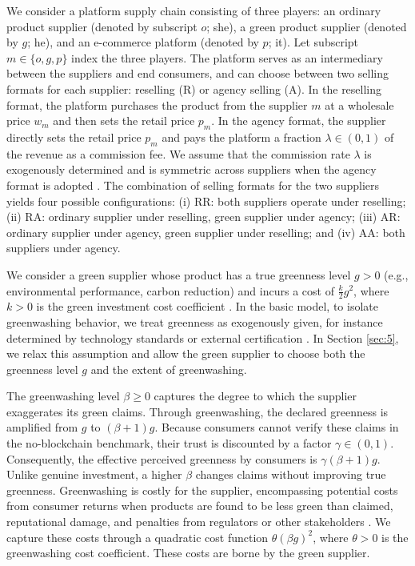 \documentclass[preprint,review,12pt,authoryear,nopreprintline]{elsarticle}
\theoremstyle{definition}
\begin{document}
We consider a platform supply chain consisting of three players: an ordinary product supplier (denoted by subscript $o$; she), a green product supplier (denoted by $g$; he), and an e-commerce platform (denoted by $p$; it). Let subscript $m \in\{o, g, p\}$ index the three players. The platform serves as an intermediary between the suppliers and end consumers, and can choose between two selling formats for each supplier: reselling (R) or agency selling (A). In the reselling format, the platform purchases the product from the supplier $m$ at a wholesale price $w_m$ and then sets the retail price $p_m$. In the agency format, the supplier directly sets the retail price $p_m$ and pays the platform a fraction $\lambda \in (0,1)$ of the revenue as a commission fee. We assume that the commission rate $\lambda$ is exogenously determined and is symmetric across suppliers when the agency format is adopted \citep{li2024selling,yuan2025re}. The combination of selling formats for the two suppliers yields four possible configurations: (i) RR: both suppliers operate under reselling; (ii) RA: ordinary supplier under reselling, green supplier under agency; (iii) AR: ordinary supplier under agency, green supplier under reselling; and (iv) AA: both suppliers under agency.

We consider a green supplier whose product has a true greenness level $g > 0$ (e.g., environmental performance, carbon reduction) and incurs a cost of $\frac{k}{2}g^2$, where $k > 0$ is the green investment cost coefficient \citep{shen2022combat,xu2023coor}. In the basic model, to isolate greenwashing behavior, we treat greenness as exogenously given, for instance determined by technology standards or external certification \citep{xu2025should}. In Section \ref{sec:5}, we relax this assumption and allow the green supplier to choose both the greenness level $g$ and the extent of greenwashing.

The greenwashing level $\beta \geq 0$ captures the degree to which the supplier exaggerates its green claims. Through greenwashing, the declared greenness is amplified from $g$ to $(\beta + 1)g$. Because consumers cannot verify these claims in the no-blockchain benchmark, their trust is discounted by a factor $\gamma \in (0,1)$. Consequently, the effective perceived greenness by consumers is $\gamma(\beta + 1)g$. Unlike genuine investment, a higher $\beta$ changes claims without improving true greenness. Greenwashing is costly for the supplier, encompassing potential costs from consumer returns when products are found to be less green than claimed, reputational damage, and penalties from regulators or other stakeholders \citep{wu2020bad,huang2020coml}. We capture these costs through a quadratic cost function $\theta(\beta g)^2$, where $\theta > 0$ is the greenwashing cost coefficient. These costs are borne by the green supplier.
\end{document}
